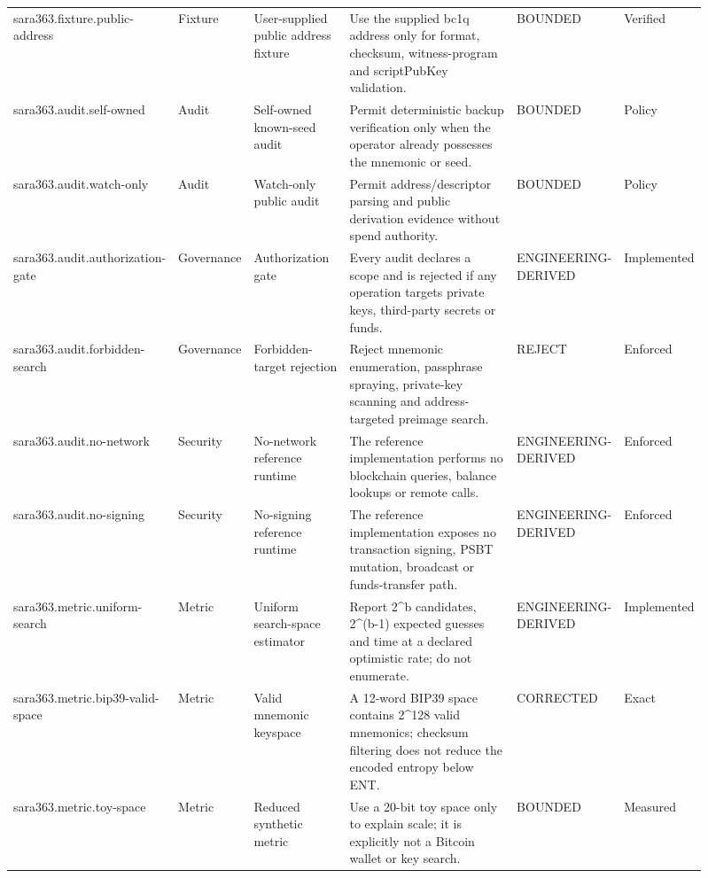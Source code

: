 \begin{longtable}{@{}p{0.17\linewidth} p{0.09\linewidth} p{0.15\linewidth} p{0.32\linewidth} p{0.10\linewidth} p{0.08\linewidth}@{}}
\addlinespace[1.5pt]
sara363.fixture.public-address & Fixture & User-supplied public address fixture & Use the supplied bc1q address only for format, checksum, witness-program and scriptPubKey validation. & BOUNDED & Verified\\
\addlinespace[1.5pt]
sara363.audit.self-owned & Audit & Self-owned known-seed audit & Permit deterministic backup verification only when the operator already possesses the mnemonic or seed. & BOUNDED & Policy\\
\addlinespace[1.5pt]
sara363.audit.watch-only & Audit & Watch-only public audit & Permit address/descriptor parsing and public derivation evidence without spend authority. & BOUNDED & Policy\\
\addlinespace[1.5pt]
sara363.audit.authorization-gate & Governance & Authorization gate & Every audit declares a scope and is rejected if any operation targets private keys, third-party secrets or funds. & ENGINEERING-DERIVED & Implemented\\
\addlinespace[1.5pt]
sara363.audit.forbidden-search & Governance & Forbidden-target rejection & Reject mnemonic enumeration, passphrase spraying, private-key scanning and address-targeted preimage search. & REJECT & Enforced\\
\addlinespace[1.5pt]
sara363.audit.no-network & Security & No-network reference runtime & The reference implementation performs no blockchain queries, balance lookups or remote calls. & ENGINEERING-DERIVED & Enforced\\
\addlinespace[1.5pt]
sara363.audit.no-signing & Security & No-signing reference runtime & The reference implementation exposes no transaction signing, PSBT mutation, broadcast or funds-transfer path. & ENGINEERING-DERIVED & Enforced\\
\addlinespace[1.5pt]
sara363.metric.uniform-search & Metric & Uniform search-space estimator & Report 2\textasciicircum{}b candidates, 2\textasciicircum{}(b-1) expected guesses and time at a declared optimistic rate; do not enumerate. & ENGINEERING-DERIVED & Implemented\\
\addlinespace[1.5pt]
sara363.metric.bip39-valid-space & Metric & Valid mnemonic keyspace & A 12-word BIP39 space contains 2\textasciicircum{}128 valid mnemonics; checksum filtering does not reduce the encoded entropy below ENT. & CORRECTED & Exact\\
\addlinespace[1.5pt]
sara363.metric.toy-space & Metric & Reduced synthetic metric & Use a 20-bit toy space only to explain scale; it is explicitly not a Bitcoin wallet or key search. & BOUNDED & Measured\\

\end{longtable}
